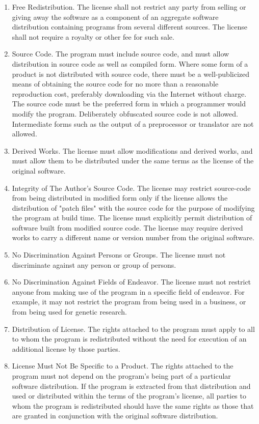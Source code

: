 \begin{enumerate}
\item{Free Redistribution}. The license shall not restrict any party from selling or giving away the software as a component of an aggregate software distribution containing programs from several different sources. The license shall not require a royalty or other fee for such sale.
\item{Source Code}. The program must include source code, and must allow distribution in source code as well as compiled form. Where some form of a product is not distributed with source code, there must be a well-publicized means of obtaining the source code for no more than a reasonable reproduction cost, preferably downloading via the Internet without charge. The source code must be the preferred form in which a programmer would modify the program. Deliberately obfuscated source code is not allowed. Intermediate forms such as the output of a preprocessor or translator are not allowed.
\item{Derived Works}. The license must allow modifications and derived works, and must allow them to be distributed under the same terms as the license of the original software.
\item{Integrity of The Author's Source Code}.
  The license may restrict source-code from being distributed in modified form only if the license allows the distribution of "patch files" with the source code for the purpose of modifying the program at build time. The license must explicitly permit distribution of software built from modified source code. The license may require derived works to carry a different name or version number from the original software.
\item{No Discrimination Against Persons or Groups}.
  The license must not discriminate against any person or group of persons.
\item{No Discrimination Against Fields of Endeavor}.
  The license must not restrict anyone from making use of the program in a specific field of endeavor. For example, it may not restrict the program from being used in a business, or from being used for genetic research.
\item{Distribution of License}.
  The rights attached to the program must apply to all to whom the program is redistributed without the need for execution of an additional license by those parties.
\item{License Must Not Be Specific to a Product}.
  The rights attached to the program must not depend on the program's being part of a particular software distribution. If the program is extracted from that distribution and used or distributed within the terms of the program's license, all parties to whom the program is redistributed should have the same rights as those that are granted in conjunction with the original software distribution.

\end{enumerate}

